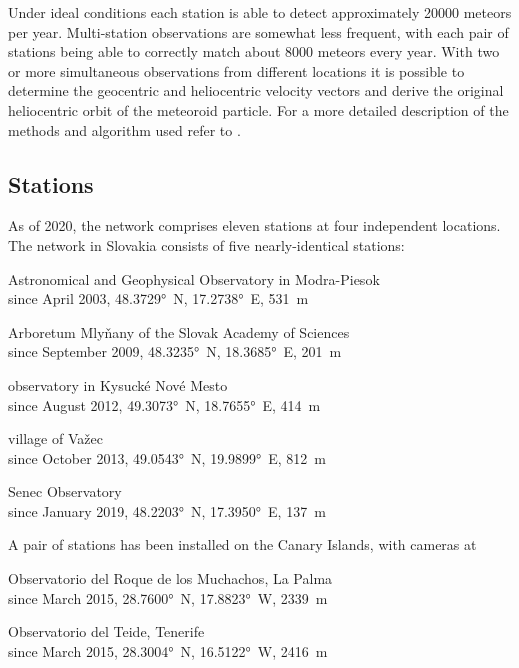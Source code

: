         Under ideal conditions each station is able to detect approximately 20000 meteors per year.
        Multi-station observations are somewhat less frequent, with each pair of stations being able
        to correctly match about 8000 meteors every year.
        With two or more simultaneous observations from different locations it is possible to determine
        the geocentric and heliocentric velocity vectors and derive the original heliocentric orbit of the meteoroid particle.
        For a more detailed description of the methods and algorithm used refer to \citet{kornos+2015}.

    \subsection{Stations} \label{iAs}
        As of 2020, the network comprises eleven stations at four independent locations.
        The network in Slovakia consists of five nearly-identical stations:
        \begin{description}[leftmargin = 25mm]
            \item[AGO]      Astronomical and Geophysical Observatory in Modra-Piesok\\
                            since April 2003, \ang{48.3729}~N, \ang{17.2738}~E, \SI{531}{\metre}
            \item[ARBO]     Arboretum Mlyňany of the Slovak Academy of Sciences\\
                            since September 2009, \ang{48.3235}~N, \ang{18.3685}~E, \SI{201}{\metre}
            \item[KNM]      observatory in Kysucké Nové Mesto\\
                            since August 2012, \ang{49.3073}~N, \ang{18.7655}~E, \SI{414}{\metre}
            \item[VAZEC]    village of Važec\\
                            since October 2013, \ang{49.0543}~N, \ang{19.9899}~E, \SI{812}{\metre}
            \item[SENEC]    Senec Observatory\\
                            since January 2019, \ang{48.2203}~N, \ang{17.3950}~E, \SI{137}{\metre}
        \end{description}

        A pair of stations has been installed on the Canary Islands, with cameras at
        \begin{description}[leftmargin = 25mm]
            \item[LP]       Observatorio del Roque de los Muchachos, La Palma \\
                            since March 2015, \ang{28.7600}~N, \ang{17.8823}~W, \SI{2339}{\metre}
            \item[TE]       Observatorio del Teide, Tenerife \\
                            since March 2015, \ang{28.3004}~N, \ang{16.5122}~W, \SI{2416}{\metre}
        \end{description}

